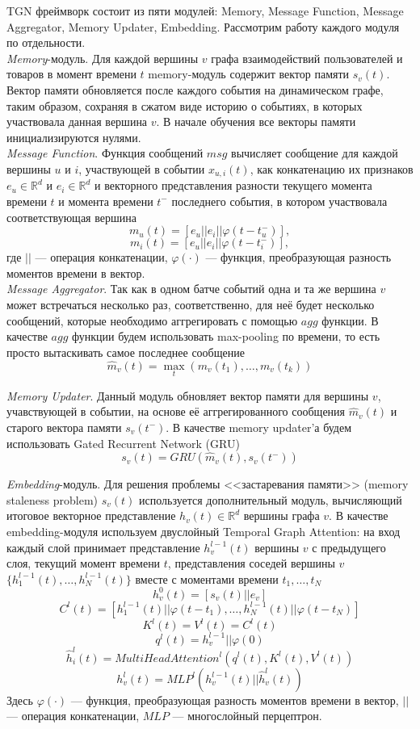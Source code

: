 \documentclass{mipt-thesis-ms}
\renewcommand{\phi}{\varphi}  %
\begin{document}
TGN фреймворк состоит из пяти модулей: Memory, Message Function, Message Aggregator, Memory Updater, Embedding. Рассмотрим работу каждого модуля по отдельности.\\

{\it Memory}-модуль. Для каждой вершины $v$ графа взаимодействий пользователей и товаров в момент времени $t$ memory-модуль содержит вектор памяти $s_{v}(t)$. Вектор памяти обновляется после каждого события на динамическом графе, таким образом, сохраняя в сжатом виде историю о событиях, в которых участвовала данная вершина $v$. В начале обучения все векторы памяти инициализируются нулями.\\

{\it Message Function}. Функция сообщений ${msg}$ вычисляет сообщение для каждой вершины $u$ и $i$, участвующей в событии $x_{u, i}(t)$, как конкатенацию их признаков $e_u \in \mathbb{R}^d$ и $e_i \in \mathbb{R}^d$ и векторного представления разности текущего момента времени $t$ и момента времени $t^-$ последнего события, в котором участвовала соответствующая вершина 
$$m_u(t) = [e_u || e_i || \phi(t - t^-_u)],$$
$$m_i(t) = [e_u || e_i || \phi(t - t^-_i)],$$
где $||$ --- операция конкатенации, $\phi(\cdot)$ --- функция, преобразующая разность моментов времени в вектор.\\

{\it Message Aggregator}. Так как в одном батче событий одна и та же вершина $v$ может встречаться несколько раз, соответственно, для неё будет несколько сообщений, которые необходимо аггрегировать с помощью $agg$ функции. В качестве $agg$ функции будем использовать max-pooling по времени, то есть просто вытаскивать самое последнее сообщение
$$\hat m_v(t) = \max_t(m_v(t_1), \dots, m_v(t_k))$$

{\it Memory Updater}. Данный модуль обновляет вектор памяти для вершины $v$, учавствующей в событии, на основе её аггрегированного сообщения $\hat m_v(t)$ и старого вектора памяти $s_v(t^-)$. В качестве memory updater'а будем использовать Gated Recurrent Network (GRU)
$$s_v(t) = GRU(\hat m_v(t), s_v(t^-))$$

{\it Embedding}-модуль. Для решения проблемы <<застаревания памяти>> (memory staleness problem) $s_v(t)$ используется дополнительный модуль, вычисляющий итоговое векторное представление $h_v(t) \in \mathbb{R}^d$ вершины графа $v$. В качестве embedding-модуля используем двуслойный Temporal Graph Attention: на вход каждый слой принимает представление $h_v^{l-1}(t)$ вершины $v$ с предыдущего слоя, текущий момент времени $t$, представления соседей вершины $v$ $\{h_1^{l-1}(t), \dots, h_N^{l-1}(t)\}$ вместе с моментами времени $t_1, \dots, t_N$
$$h_v^0(t) = [s_v(t) || e_v]$$
$$C^l(t) = [h_1^{l-1}(t)||\phi(t - t_1), \dots, h_N^{l-1}(t)||\phi(t - t_N)]$$
$$K^l(t) = V^l(t) = C^l(t)$$
$$q^l(t) = h_v^{l-1} || \phi(0)$$
$$\hat h_i^l(t) = MultiHeadAttention^l(q^l(t), K^l(t), V^l(t))$$
$$h_v^l(t) = MLP^l(h_v^{l-1}(t) || \hat h_v^l(t))$$
Здесь $\phi(\cdot)$ --- функция, преобразующая разность моментов времени в вектор, $||$ --- операция конкатенации, $MLP$ --- многослойный перцептрон.
\end{document}
